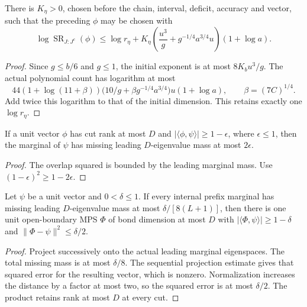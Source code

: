 \begin{lemma}
    \label{lem:ld_sharp_logarithmic_cut_rank}
    \leanok
    There is $K_\eta>0$, chosen before the chain, interval, deficit,
    accuracy and vector, such that the preceding $\phi$ may be chosen with
    \[
        \log\operatorname{SR}_{J:J^c}(\phi)
        \le\log r_\eta+
        K_\eta\left(\frac{u^3}{g}
        +g^{-1/4}a^{3/4}u\right)(1+\log a).
    \]
\end{lemma}
\begin{proof}\leanok
    Since $g\le b/6$ and $g\le1$,
    the initial exponent is at most $8K_bu^3/g$.
    The actual polynomial count has logarithm at most
    \[
        44(1+\log(11+\beta))
        \bigl(10/g+\beta g^{-1/4}a^{3/4}\bigr)u(1+\log a),
        \qquad\beta=(7C)^{1/4}.
    \]
    Add twice this logarithm to that of the initial dimension.
    This retains exactly one $\log r_\eta$.
\end{proof}

\begin{lemma}
    \label{lem:regional_overlap_to_missing_mass}
    \leanok
    If a unit vector $\phi$ has cut rank at most $D$ and
    $|\langle\phi,\psi\rangle|\ge1-\epsilon$, where $\epsilon\le1$,
    then the marginal of $\psi$ has missing leading $D$-eigenvalue
    mass at most $2\epsilon$.
\end{lemma}
\begin{proof}\leanok
    The overlap squared is bounded by the leading marginal mass.
    Use $(1-\epsilon)^2\ge1-2\epsilon$.
\end{proof}

\begin{lemma}
    \label{lem:normalized_sequential_prefix_mass}
    \leanok
    Let $\psi$ be a unit vector and $0<\delta\le1$.
    If every internal prefix marginal has missing leading
    $D$-eigenvalue mass at most $\delta/[8(L+1)]$, then there is
    one unit open-boundary MPS $\Phi$ of bond dimension at most $D$
    with $|\langle\Phi,\psi\rangle|\ge1-\delta$ and
    $\|\Phi-\psi\|^2\le\delta/2$.
\end{lemma}
\begin{proof}\leanok
    Project successively onto the actual leading marginal eigenspaces.
    The total missing mass is at most $\delta/8$.
    The sequential projection estimate gives that squared error for the
    resulting vector, which is nonzero. Normalization increases the
    distance by a factor at most two, so the squared error is at most
    $\delta/2$. The product retains rank at most $D$ at every cut.
\end{proof}

